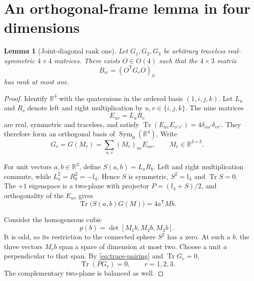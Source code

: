 \documentclass[11pt]{article}
\newtheorem{lemma}[theorem]{Lemma}
\theoremstyle{remark}
\newcommand{\Tr}{\operatorname{Tr}}
\newcommand{\1}{\mathbb{I}}
\newcommand{\R}{\mathbb{R}}
\begin{document}
\section{An orthogonal-frame lemma in four dimensions}
\label{sec:lemma}

\begin{lemma}[Joint-diagonal rank one]
\label{lem:frame}
Let $G_1,G_2,G_3$ be arbitrary traceless real-symmetric $4\times4$ matrices.
There exists $O\in O(4)$ such that the $4\times3$ matrix
\begin{equation}
 B_{ir}=(O^{\mathsf T}G_rO)_{ii}
 \end{equation}
has rank at most one.
\end{lemma}

\begin{proof}
Identify $\R^4$ with the quaternions in the ordered basis $(1,i,j,k)$.  Let
$L_u$ and $R_v$ denote left and right multiplication by
$u,v\in\{i,j,k\}$.  The nine matrices
\begin{equation}
 E_{uv}=L_uR_v
\end{equation}
are real, symmetric and traceless, and satisfy
$\Tr(E_{uv}E_{u'v'})=4\delta_{uu'}\delta_{vv'}$.  They therefore form an
orthogonal basis of $\operatorname{Sym}_0(\R^4)$.  Write
\begin{equation}
 G_r=G(M_r)=\sum_{u,v}(M_r)_{uv}E_{uv},\qquad M_r\in\R^{3\times3}.
\end{equation}

For unit vectors $a,b\in\R^3$, define
$S(a,b)=L_aR_b$.  Left and right multiplication commute, while
$L_a^2=R_b^2=-\1_4$.  Hence $S$ is symmetric, $S^2=\1_4$ and
$\Tr S=0$.  The $+1$ eigenspace is a two-plane with projector
$P=(\1_4+S)/2$, and orthogonality of the $E_{uv}$ gives
\begin{equation}
 \Tr\bigl(S(a,b)G(M)\bigr)=4a^{\mathsf T}Mb .
 \label{eq:trace-pairing}
\end{equation}

Consider the homogeneous cubic
\begin{equation}
 p(b)=\det[M_1b,M_2b,M_3b].
\end{equation}
It is odd, so its restriction to the connected sphere $S^2$ has a zero.
At such a $b$, the three vectors $M_rb$ span a space of dimension at most
two.  Choose a unit $a$ perpendicular to that span.  By
\cref{eq:trace-pairing} and $\Tr G_r=0$,
\begin{equation}
 \Tr(PG_r)=0,\qquad r=1,2,3 .
 \label{eq:balance}
\end{equation}
The complementary two-plane is balanced as well.


\end{proof}
\end{document}
